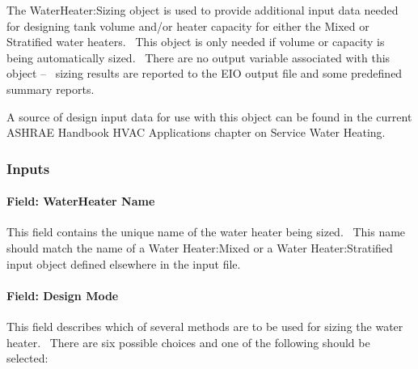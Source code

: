 The WaterHeater:Sizing object is used to provide additional input data needed for designing tank volume and/or heater capacity for either the Mixed or Stratified water heaters.~ This object is only needed if volume or capacity is being automatically sized.~ There are no output variable associated with this object --~ sizing results are reported to the EIO output file and some predefined summary reports.

A source of design input data for use with this object can be found in the current ASHRAE Handbook HVAC Applications chapter on Service Water Heating.

\subsubsection{Inputs}\label{inputs-2-045}

\paragraph{Field: WaterHeater Name}\label{field-waterheater-name}

This field contains the unique name of the water heater being sized.~ This name should match the name of a Water Heater:Mixed or a Water Heater:Stratified input object defined elsewhere in the input file.

\paragraph{Field: Design Mode}\label{field-design-mode}

This field describes which of several methods are to be used for sizing the water heater.~ There are six possible choices and one of the following should be selected:

